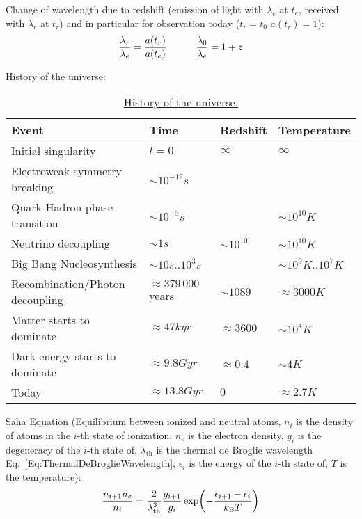 			\noindent
			Change of wavelength due to redshift (emission of light with $\lambda_e$ at $t_e$, received with $\lambda_r$ at $t_r$) and in particular for observation today ($t_r=t_0$ \ie $a(t_r)=1$):
			\begin{equation}
				\frac{\lambda_r}{\lambda_e} = \frac{a(t_r)}{a(t_e)}
				\hspace{30pt}
				\frac{\lambda_0}{\lambda_e} = 1+z
			\end{equation}

			\noindent
			History of the universe:
			\begin{table}[ht]
				\begin{center}
					\begin{tabular}{ l | l | l | l }
						Event & Time & Redshift & Temperature \\ \hline
						Initial singularity & $t=0$ & $\infty$ & $\infty$ \\
						Electroweak symmetry breaking & $\sim 10^{-12}\unit{s}$ & & \\
						Quark Hadron phase transition & $\sim 10^{-5}\unit{s}$ & & $\sim 10^{10}\unit{K}$ \\
						Neutrino decoupling & $\sim 1\unit{s}$ & $\sim 10^{10}$ & $\sim 10^{10}\unit{K}$ \\
						Big Bang Nucleosynthesis & $\sim 10 \unit{s}..10^3\unit{s}$ & & $\sim 10^9\unit{K}..10^7\unit{K}$ \\
						Recombination/Photon decoupling & $\approx 379\,000$ years & $\sim 1089$ & $\approx 3000\unit{K}$ \\
						Matter starts to dominate & $\approx 47\unit{kyr}$ & $\approx 3600$ & $\sim 10^4\unit{K}$ \\
						Dark energy starts to dominate & $\approx 9.8\unit{Gyr}$ & $\approx 0.4$ & $\sim 4\unit{K}$ \\
						Today & $\approx 13.8\unit{Gyr}$ & $0$ & $\approx 2.7\unit{K}$ \\
					\end{tabular}
					\caption{\href{https://en.wikipedia.org/wiki/Chronology_of_the_universe}{History of the universe.}}
				\end{center}
			\end{table}

			\noindent
			Saha Equation (Equilibrium between ionized and neutral atoms, $n_i$ is the density of atoms in the $i$-th state of ionization, $n_e$ is the electron density, $g_i$ is the degeneracy of the $i$-th state of, $\lambda_\text{th}$ is the thermal de Broglie wavelength Eq.~\ref{Eq:ThermalDeBroglieWavelength}, $\epsilon_i$ is the energy of the $i$-th state of, $T$ is the temperature):
			\begin{equation}
				\frac{n_{i+1} n_e}{n_i} = \frac{2}{\lambda_\text{th}^3} \frac{g_{i+1}}{g_i} \exp(- \frac{\epsilon_{i+1}-\epsilon_{i}}{k_{\text{B}} T})
			\end{equation}


